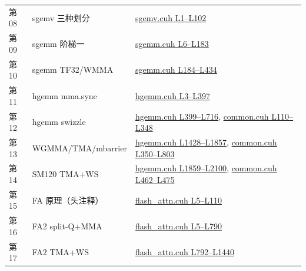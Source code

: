\begin{longtable}{llp{7.2cm}}
第08 & sgemv 三种划分 & \href{https://github.com/xlite-dev/LeetCUDA/blob/6cd32deca683d6c4aae2011988c9f4a35bc5f528/kernels/interview/sgemv.cuh#L1-L102}{sgemv.cuh L1--L102} \\
第09 & sgemm 阶梯一 & \href{https://github.com/xlite-dev/LeetCUDA/blob/6cd32deca683d6c4aae2011988c9f4a35bc5f528/kernels/interview/sgemm.cuh#L6-L183}{sgemm.cuh L6--L183} \\
第10 & sgemm TF32/WMMA & \href{https://github.com/xlite-dev/LeetCUDA/blob/6cd32deca683d6c4aae2011988c9f4a35bc5f528/kernels/interview/sgemm.cuh#L184-L434}{sgemm.cuh L184--L434} \\
第11 & hgemm mma.sync & \href{https://github.com/xlite-dev/LeetCUDA/blob/6cd32deca683d6c4aae2011988c9f4a35bc5f528/kernels/interview/hgemm.cuh#L3-L397}{hgemm.cuh L3--L397} \\
第12 & hgemm swizzle & \href{https://github.com/xlite-dev/LeetCUDA/blob/6cd32deca683d6c4aae2011988c9f4a35bc5f528/kernels/interview/hgemm.cuh#L399-L716}{hgemm.cuh L399--L716}, \href{https://github.com/xlite-dev/LeetCUDA/blob/6cd32deca683d6c4aae2011988c9f4a35bc5f528/kernels/interview/common.cuh#L110-L348}{common.cuh L110--L348} \\
第13 & WGMMA/TMA/mbarrier & \href{https://github.com/xlite-dev/LeetCUDA/blob/6cd32deca683d6c4aae2011988c9f4a35bc5f528/kernels/interview/hgemm.cuh#L1428-L1857}{hgemm.cuh L1428--L1857}, \href{https://github.com/xlite-dev/LeetCUDA/blob/6cd32deca683d6c4aae2011988c9f4a35bc5f528/kernels/interview/common.cuh#L350-L803}{common.cuh L350--L803} \\
第14 & SM120 TMA+WS & \href{https://github.com/xlite-dev/LeetCUDA/blob/6cd32deca683d6c4aae2011988c9f4a35bc5f528/kernels/interview/hgemm.cuh#L1859-L2100}{hgemm.cuh L1859--L2100}, \href{https://github.com/xlite-dev/LeetCUDA/blob/6cd32deca683d6c4aae2011988c9f4a35bc5f528/kernels/interview/common.cuh#L462-L475}{common.cuh L462--L475} \\
第15 & FA 原理（头注释） & \href{https://github.com/xlite-dev/LeetCUDA/blob/6cd32deca683d6c4aae2011988c9f4a35bc5f528/kernels/interview/flash_attn.cuh#L5-L110}{flash\_attn.cuh L5--L110} \\
第16 & FA2 split-Q+MMA & \href{https://github.com/xlite-dev/LeetCUDA/blob/6cd32deca683d6c4aae2011988c9f4a35bc5f528/kernels/interview/flash_attn.cuh#L5-L790}{flash\_attn.cuh L5--L790} \\
第17 & FA2 TMA+WS & \href{https://github.com/xlite-dev/LeetCUDA/blob/6cd32deca683d6c4aae2011988c9f4a35bc5f528/kernels/interview/flash_attn.cuh#L792-L1440}{flash\_attn.cuh L792--L1440} \\

\end{longtable}
